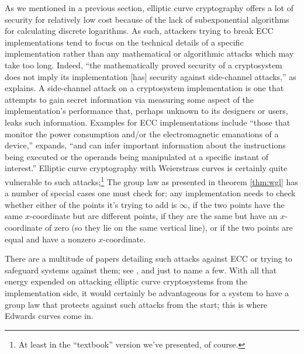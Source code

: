As we mentioned in a previous section, elliptic curve cryptography offers a lot
    of security for relatively low cost because of the lack of subexponential
    algorithms for calculating discrete logarithms.
As such, attackers trying to break ECC implementations tend to focus on the
    technical details of a specific implementation rather than any mathematical
    or algorithmic attacks which may take too long.
Indeed, ``the mathematically proved security of a cryptosystem does not imply
    its implementation [has] security against side-channel attacks,'' as
    \cite{reddy2009elliptic} explains.
A side-channel attack on a cryptosystem implementation is one that attempts to
    gain secret information via measuring some aspect of the implementation's
    performance that, perhaps unknown to its designers or users, leaks such
    information.
Examples for ECC implementations include ``those that monitor the power
    consumption and/or the electromagnetic emanations of a device,''
    \cite{reddy2009elliptic} expands, ``and can infer important information
    about the instructions being executed or the operands being manipulated at
    a specific instant of interest.''
Elliptic curve cryptography with Weierstrass curves is certainly quite
    vulnerable to such attacks;\footnote{At least in the ``textbook'' version
    we've presented, of course.}
The group law as presented in theorem \ref{thm:wgl} has a number of special
    cases one must check for; any implementation needs to check whether either
    of the points it's trying to add is $\infty$, if the two points have the
    same $x$-coordinate but are different points, if they are the same but have
    an $x$-coordinate of zero (so they lie on the same vertical line), or if
    the two points are equal and have a nonzero $x$-coordinate.

There are a multitude of papers detailing such attacks against ECC or trying to
    safeguard systems against them; see \cite{billet2003jacobi,
    brier2002weierstrass, brumley2011timing, chevallier2004low,
    coron1999resistance, goubin2002refined, izu2002exceptional,
    izu2002improved, joye2003elliptic, joye2001hessian, moller2001securing},
    and \cite{okeya2000power} just to name a few.
With all that energy expended on attacking elliptic curve cryptosystems from
    the implementation side, it would certainly be advantageous for a system to
    have a group law that protects against such attacks from the start; this is
    where Edwards curves come in.

